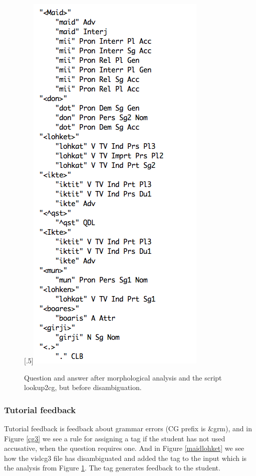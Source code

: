 \documentclass[11pt]{article}
\begin{document}
\begin{figure}[htbp]
\begin{center}
\scalebox{.55}[.5]{\includegraphics{presentation/img/iktelohken3.png}}
\caption{Question and answer after morphological analysis and the script lookup2cg, but before disambiguation.}
\label{iktelohken}
\end{center}
\end{figure}

\newpage
\subsubsection{Tutorial feedback}
Tutorial feedback is feedback about grammar errors (CG prefix is \&grm), and in Figure \ref{cg3} we see a rule for assigning a tag if the student has not used accusative, when the question requires one. And in Figure \ref{maidlohket} we see how the vislcg3 file has disambiguated and added the tag to the input which is the analysis from Figure \ref{iktelohken}. The tag generates feedback to the student.
\end{document}
